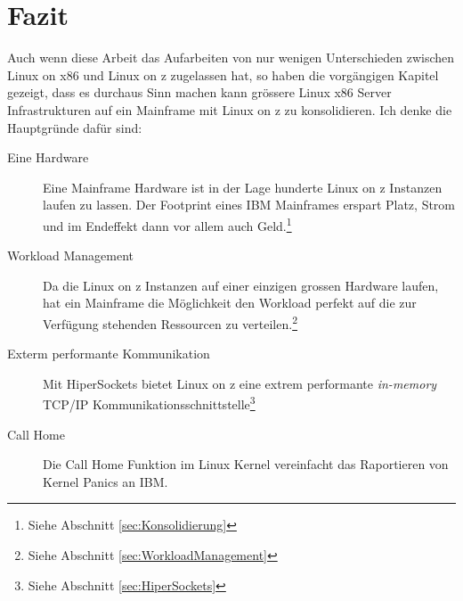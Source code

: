 \chapter{Fazit}
\label{cha:Schluss}

Auch wenn diese Arbeit das Aufarbeiten von nur wenigen Unterschieden zwischen Linux on x86 und Linux on z zugelassen hat, so haben die vorgängigen Kapitel gezeigt, dass es durchaus Sinn machen kann grössere Linux x86 Server Infrastrukturen auf ein Mainframe mit Linux on z zu konsolidieren.
Ich denke die Hauptgründe dafür sind:
\begin{description}
    \item[Eine Hardware]{Eine Mainframe Hardware ist in der Lage hunderte Linux on z Instanzen laufen zu lassen. Der Footprint eines IBM Mainframes erspart Platz, Strom und im Endeffekt dann vor allem auch Geld.\footnote{Siehe Abschnitt \ref{sec:Konsolidierung}}}
    \item[Workload Management]{Da die Linux on z Instanzen auf einer einzigen grossen Hardware laufen, hat ein Mainframe die Möglichkeit den Workload perfekt auf die zur Verfügung stehenden Ressourcen zu verteilen.\footnote{Siehe Abschnitt \ref{sec:WorkloadManagement}}}
    \item[Exterm performante Kommunikation]{Mit HiperSockets bietet Linux on z eine extrem performante \textit{in-memory} TCP/IP Kommunikationsschnittstelle\footnote{Siehe Abschnitt \ref{sec:HiperSockets}}}
    \item[Call Home]{Die Call Home Funktion im Linux Kernel vereinfacht das Raportieren von Kernel Panics an IBM.}
\end{description}
